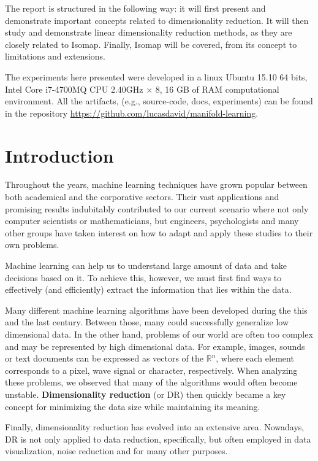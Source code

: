 \documentclass[12pt]{article}
\begin{document}
The report is structured in the following way: it will first present and demonstrate important concepts related to dimensionality reduction. It will then study and demonstrate linear dimensionality reduction methods, as they are closely related to Isomap. Finally, Isomap will be covered, from its concept to limitations and extensions.

The experiments here presented were developed in a linux Ubuntu 15.10 64 bits, Intel Core i7-4700MQ CPU 2.40GHz $\times$ 8, 16 GB of RAM computational environment. All the artifacts, (e.g., source-code, docs, experiments) can be found in the repository \url{https://github.com/lucasdavid/manifold-learning}.

\newpage

\section{Introduction}

Throughout the years, machine learning techniques have grown popular between both academical and the corporative sectors. Their vast applications and promising results \cite{brownlee} indubitably contributed to our current scenario where not only computer scientists or mathematicians, but engineers, psychologists and many other groups have taken interest \cite{baldi2001bioinformatics} on how to adapt and apply these studies to their own problems.

Machine learning can help us to understand large amount of data and take decisions based on it. To achieve this, however, we must first find ways to effectively (and efficiently) extract the information that lies within the data.

Many different machine learning algorithms have been developed during the this and the last century. Between those, many could successfully generalize low dimensional data. \cite{wang2012geometric} In the other hand, problems of our world are often too complex and may be represented by high dimensional data. For example, images, sounds or text documents can be expressed as vectors of the $\mathbb{R}^n$, where each element corresponds to a pixel, wave signal or character, respectively. When analyzing these problems, we observed that many of the algorithms would often become unstable. \textbf{Dimensionality reduction} (or DR) then quickly became a key concept for minimizing the data size while maintaining its meaning.

Finally, dimensionality reduction has evolved into an extensive area. Nowadays, DR is not only applied to data reduction, specifically, but often employed in data visualization, noise reduction and for many other purposes.
\end{document}
